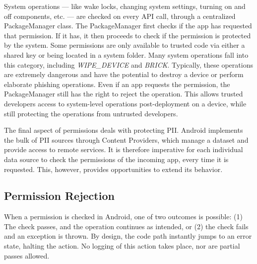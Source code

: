 System operations --- like wake locks, changing system settings, turning on and off components, etc. --- are checked on every API call, through a centralized PackageManager class. The PackageManager first checks if the app has requested that permission. If it has, it then proceeds to check if the permission is protected by the system. Some permissions are only available to trusted code via either a shared key or being located in a system folder. Many system operations fall into this category, including \textit{WIPE\_DEVICE} and \textit{BRICK}. Typically, these operations are extremely dangerous and have the potential to destroy a device or perform elaborate phishing operations. Even if an app requests the permission, the PackageManager still has the right to reject the operation. This allows trusted developers access to system-level operations post-deployment on a device, while still protecting the operations from untrusted developers.

The final aspect of permissions deals with protecting PII. Android implements the bulk of PII sources through Content Providers, which manage a dataset and provide access to remote services. It is therefore imperative for each individual data source to check the permissions of the incoming app, every time it is requested. This, however, provides opportunities to extend its behavior.

\subsection{Permission Rejection}
\label{sec:permissionrejection}
When a permission is checked in Android, one of two outcomes is possible: (1) The check passes, and the operation continues as intended, or (2) the check fails and an exception is thrown. By design, the code path instantly jumps to an error state, halting the action. No logging of this action takes place, nor are partial passes allowed.

